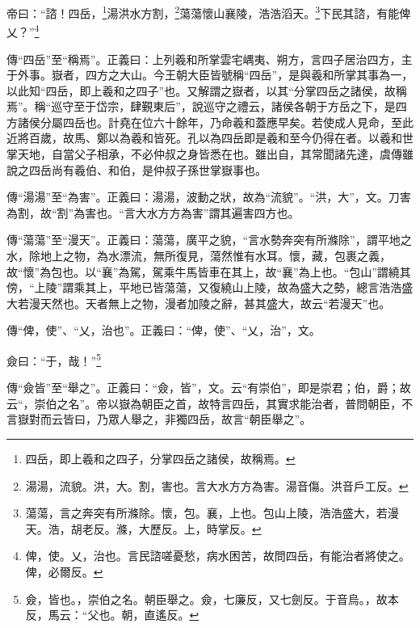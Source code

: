 帝曰：“諮！四岳，\footnote{四岳，即上羲和之四子，分掌四岳之諸侯，故稱焉。}湯洪水方割，\footnote{湯湯，流貌。洪，大。割，害也。言大水方方為害。湯音傷。洪音戶工反。}蕩蕩懷山襄陵，浩浩滔天。\footnote{蕩蕩，言之奔突有所滌除。懷，包。襄，上也。包山上陵，浩浩盛大，若漫天。浩，胡老反。滌，大歷反。上，時掌反。}下民其諮，有能俾乂？”\footnote{俾，使。乂，治也。言民諮嗟憂愁，病水困苦，故問四岳，有能治者將使之。俾，必爾反。}

{\noindent\zhuan{}\fzbyks 傳“四岳”至“稱焉”。正義曰：上列羲和所掌雲宅嵎夷、朔方，言四子居治四方，主于外事。嶽者，四方之大山。今王朝大臣皆號稱“四岳”，是與羲和所掌其事為一，以此知“四岳，即上羲和之四子”也。又解謂之嶽者，以其“分掌四岳之諸侯，故稱焉”。稱“巡守至于岱宗，肆覲東后”，說巡守之禮云，諸侯各朝于方岳之下，是四方諸侯分屬四岳也。計堯在位六十餘年，乃命羲和蓋應早矣。若使成人見命，至此近將百歲，故馬、鄭以為羲和皆死。孔以為四岳即是羲和至今仍得在者。以羲和世掌天地，自當父子相承，不必仲叔之身皆悉在也。雖出自，其常聞諸先達，虞傳雖說之四岳尚有羲伯、和伯，是仲叔子孫世掌嶽事也。 \par}

{\noindent\zhuan{}\fzbyks 傳“湯湯”至“為害”。正義曰：湯湯，波動之狀，故為“流貌”。“洪，大”，文。刀害為割，故“割”為害也。“言大水方方為害”謂其遍害四方也。 \par}

{\noindent\zhuan{}\fzbyks 傳“蕩蕩”至“漫天”。正義曰：蕩蕩，廣平之貌，“言水勢奔突有所滌除”，謂平地之水，除地上之物，為水漂流，無所復見，蕩然惟有水耳。懷，藏，包裹之義，故“懷”為包也。以“襄”為駕，駕乘牛馬皆車在其上，故“襄”為上也。“包山”謂繞其傍，“上陵”謂乘其上，平地已皆蕩蕩，又復繞山上陵，故為盛大之勢，總言浩浩盛大若漫天然也。天者無上之物，漫者加陵之辭，甚其盛大，故云“若漫天”也。 \par}

{\noindent\zhuan{}\fzbyks 傳“俾，使”、“乂，治也”。正義曰：“俾，使”、“乂，治”，文。 \par}

僉曰：“于，哉！”\footnote{僉，皆也。，崇伯之名。朝臣舉之。僉，七廉反，又七劍反。于音烏。，故本反，馬云：“父也。朝，直遙反。}

{\noindent\zhuan{}\fzbyks 傳“僉皆”至“舉之”。正義曰：“僉，皆”，文。云“有崇伯”，即是崇君；伯，爵；故云“，崇伯之名”。帝以嶽為朝臣之首，故特言四岳，其實求能治者，普問朝臣，不言嶽對而云皆曰，乃眾人舉之，非獨四岳，故言“朝臣舉之”。 \par}

